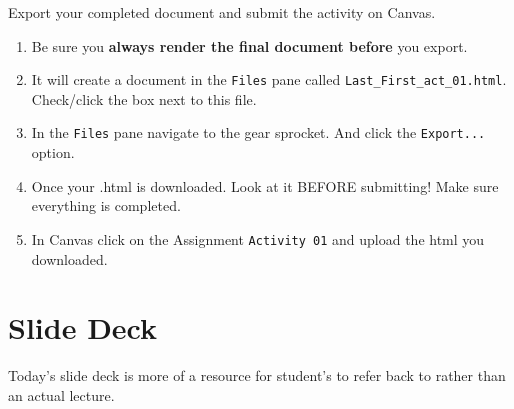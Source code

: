 \documentclass[
  letterpaper,
  DIV=11,
  numbers=noendperiod]{scrreprt}
\providecommand{\tightlist}{%
  \setlength{\itemsep}{0pt}\setlength{\parskip}{0pt}}\usepackage{longtable,booktabs,array}
\begin{document}
Export your completed document and submit the activity on Canvas.

\begin{enumerate}
\def\labelenumi{\arabic{enumi}.}
\tightlist
\item
  Be sure you \textbf{always render the final document before} you
  export.
\item
  It will create a document in the \texttt{Files} pane called
  \texttt{Last\_First\_act\_01.html}. Check/click the box next to this
  file.
\item
  In the \texttt{Files} pane navigate to the gear sprocket. And click
  the \texttt{Export...} option.
\item
  Once your .html is downloaded. Look at it BEFORE submitting! Make sure
  everything is completed.
\item
  In Canvas click on the Assignment \texttt{Activity\ 01} and upload the
  html you downloaded.
\end{enumerate}

\hypertarget{slide-deck-1}{%
\section*{Slide Deck}\label{slide-deck-1}}

Today's slide deck is more of a resource for student's to refer back to
rather than an actual lecture.
\end{document}
